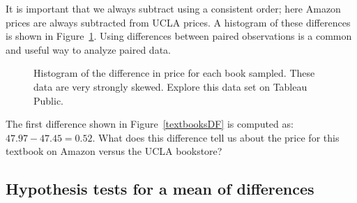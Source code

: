 It is important that we always subtract using
a consistent order;
here Amazon prices are always subtracted from UCLA prices.
A histogram of these differences is shown in
Figure~\ref{diffInTextbookPricesF18}.
Using differences between paired observations
is a common and useful way to analyze paired data.

\begin{figure}
\centering
{}
\caption{Histogram of the difference in price for
    each book sampled.
    These data are very strongly skewed.
   Explore this data set on Tableau Public.}
\label{diffInTextbookPricesF18}
\end{figure}

\begin{exercisewrap}
\begin{nexercise}
The first difference shown in Figure~\ref{textbooksDF}
is computed as: $47.97 - 47.45 = 0.52$.
What does this difference tell us about the price for this textbook on Amazon versus the UCLA bookstore?\footnotemark
\end{nexercise}
\end{exercisewrap}


\subsection{Hypothesis tests for a mean of differences}


